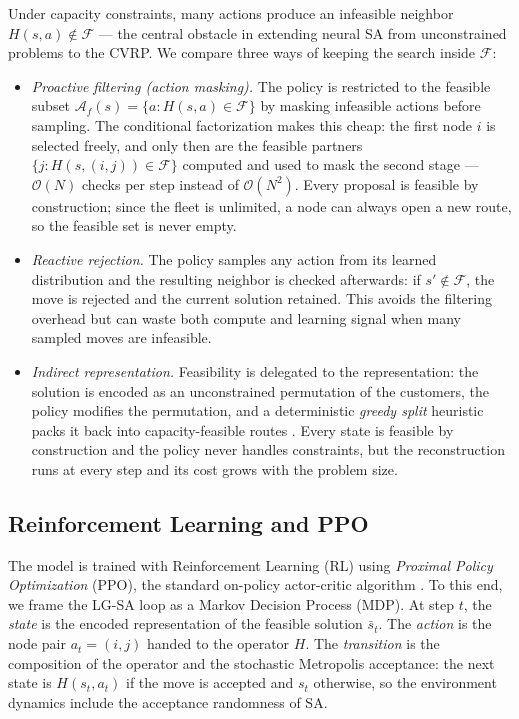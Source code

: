 \documentclass[letterpaper]{article} %
\begin{document}
Under capacity constraints, many actions produce an infeasible neighbor $H(s,a) \notin \mathcal{F}$ --- the central obstacle in extending neural SA from unconstrained problems to the CVRP. We compare three ways of keeping the search inside $\mathcal{F}$:
\begin{itemize}
\item \textit{Proactive filtering (action masking).} The policy is restricted to the feasible subset $\mathcal{A}_f(s) = \{ a : H(s, a) \in \mathcal{F} \}$ by masking infeasible actions before sampling. The conditional factorization makes this cheap: the first node $i$ is selected freely, and only then are the feasible partners $\{ j : H(s, (i,j)) \in \mathcal{F} \}$ computed and used to mask the second stage --- $\mathcal{O}(N)$ checks per step instead of $\mathcal{O}(N^2)$. Every proposal is feasible by construction; since the fleet is unlimited, a node can always open a new route, so the feasible set is never empty.
\item \textit{Reactive rejection.} The policy samples any action from its learned distribution and the resulting neighbor is checked afterwards: if $s' \notin \mathcal{F}$, the move is rejected and the current solution retained. This avoids the filtering overhead but can waste both compute and learning signal when many sampled moves are infeasible.
\item \textit{Indirect representation.} Feasibility is delegated to the representation: the solution is encoded as an unconstrained permutation of the customers, the policy modifies the permutation, and a deterministic \textit{greedy split} heuristic packs it back into capacity-feasible routes \citep{vidal_technical_2016}. Every state is feasible by construction and the policy never handles constraints, but the reconstruction runs at every step and its cost grows with the problem size.
\end{itemize}

\subsection{Reinforcement Learning and PPO}
\label{app:ppo}

The model is trained with Reinforcement Learning (RL) using \textit{Proximal Policy Optimization} (PPO), the standard on-policy actor-critic algorithm \citep{schulman_proximal_2017}. To this end, we frame the LG-SA loop as a Markov Decision Process (MDP). At step $t$, the \textit{state} is the encoded representation of the feasible solution $\bar s_t$. The \textit{action} is the node pair $a_t = (i, j)$ handed to the operator $H$. The \textit{transition} is the composition of the operator and the stochastic Metropolis acceptance: the next state is $H(s_t, a_t)$ if the move is accepted and $s_t$ otherwise, so the environment dynamics include the acceptance randomness of SA.
\end{document}
